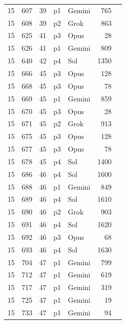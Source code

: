 \begin{longtable}{r r r l l r L{2.2in}}
15 & 607 & 39 & p1 & Gemini & 765 &  \\
15 & 608 & 39 & p2 & Grok & 863 &  \\
15 & 625 & 41 & p3 & Opus & 28 &  \\
15 & 626 & 41 & p1 & Gemini & 809 &  \\
15 & 640 & 42 & p4 & Sol & 1350 &  \\
15 & 666 & 45 & p3 & Opus & 128 &  \\
15 & 668 & 45 & p3 & Opus & 78 &  \\
15 & 669 & 45 & p1 & Gemini & 859 &  \\
15 & 670 & 45 & p3 & Opus & 28 &  \\
15 & 671 & 45 & p2 & Grok & 913 &  \\
15 & 675 & 45 & p3 & Opus & 128 &  \\
15 & 677 & 45 & p3 & Opus & 78 &  \\
15 & 678 & 45 & p4 & Sol & 1400 &  \\
15 & 686 & 46 & p4 & Sol & 1600 &  \\
15 & 688 & 46 & p1 & Gemini & 849 &  \\
15 & 689 & 46 & p4 & Sol & 1610 &  \\
15 & 690 & 46 & p2 & Grok & 903 &  \\
15 & 691 & 46 & p4 & Sol & 1620 &  \\
15 & 692 & 46 & p3 & Opus & 68 &  \\
15 & 693 & 46 & p4 & Sol & 1630 &  \\
15 & 704 & 47 & p1 & Gemini & 799 &  \\
15 & 712 & 47 & p1 & Gemini & 619 &  \\
15 & 717 & 47 & p1 & Gemini & 319 &  \\
15 & 725 & 47 & p1 & Gemini & 19 &  \\
15 & 733 & 47 & p1 & Gemini & 94 &  \\

\end{longtable}
